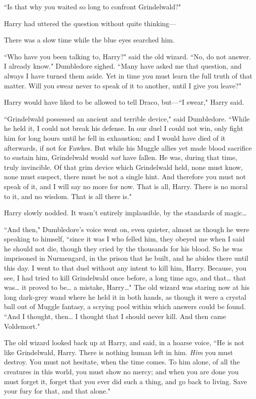 ``Is that why you waited so long to confront Grindelwald?"

Harry had uttered the question without quite thinking—

There was a slow time while the blue eyes searched him.

``Who have you been talking to, Harry?" said the old wizard. ``No, do not answer. I already know." Dumbledore sighed. ``Many have asked me that question, and always I have turned them aside. Yet in time you must learn the full truth of that matter. Will you swear never to speak of it to another, until I give you leave?"

Harry would have liked to be allowed to tell Draco, but—``I swear," Harry said.

``Grindelwald possessed an ancient and terrible device," said Dumbledore. ``While he held it, I could not break his defense. In our duel I could not win, only fight him for long hours until he fell in exhaustion; and I would have died of it afterwards, if not for Fawkes. But while his Muggle allies yet made blood sacrifice to sustain him, Grindelwald would \emph{not} have fallen. He was, during that time, truly invincible. Of that grim device which Grindelwald held, none must know, none must suspect, there must be not a single hint. And therefore you must not speak of it, and I will say no more for now. That is all, Harry. There is no moral to it, and no wisdom. That is all there is."

Harry slowly nodded. It wasn't entirely implausible, by the standards of magic{\ldots}

``And then," Dumbledore's voice went on, even quieter, almost as though he were speaking to himself, ``since it was I who felled him, they obeyed me when I said he should not die, though they cried by the thousands for his blood. So he was imprisoned in Nurmengard, in the prison that he built, and he abides there until this day. I went to that duel without any intent to kill him, Harry. Because, you see, I had tried to kill Grindelwald once before, a long time ago, and that{\ldots} that was{\ldots} it proved to be{\ldots} a mistake, Harry{\ldots}" The old wizard was staring now at his long dark-grey wand where he held it in both hands, as though it were a crystal ball out of Muggle fantasy, a scrying pool within which answers could be found. ``And I thought, then{\ldots} I thought that I should never kill. And then came Voldemort."

The old wizard looked back up at Harry, and said, in a hoarse voice, ``He is not like Grindelwald, Harry. There is nothing human left in him. \emph{Him} you must destroy. You must not hesitate, when the time comes. To him alone, of all the creatures in this world, you must show no mercy; and when you are done you must forget it, forget that you ever did such a thing, and go back to living. Save your fury for that, and that alone."

